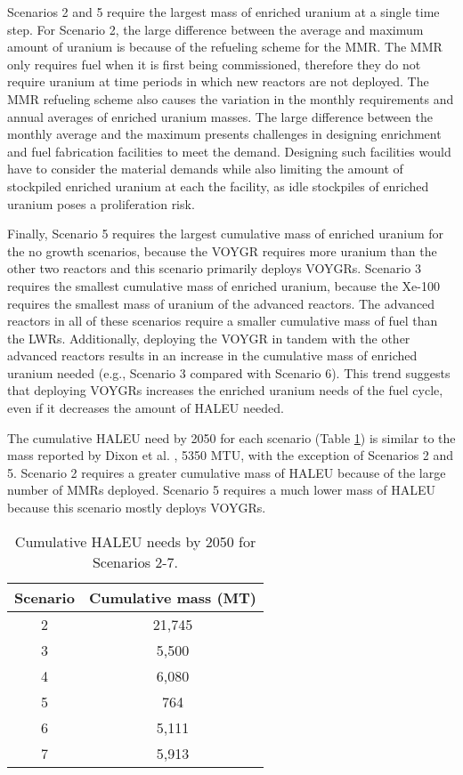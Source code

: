 Scenarios 2 and 5 require the largest mass of enriched uranium at a single 
time step. For Scenario 2, the large difference between the average and 
maximum amount of uranium is because of the refueling scheme for the 
\gls{MMR}. The \gls{MMR} only requires fuel when it is first being 
commissioned, therefore they do not require uranium at time periods in 
which
new reactors are not deployed. The \gls{MMR} refueling scheme also 
causes the variation in the monthly requirements and annual averages of 
enriched uranium masses. The large difference between the 
monthly average and the maximum presents challenges in designing enrichment 
and fuel fabrication facilities 
to meet the demand. Designing such facilities would have to consider the 
material demands while also limiting the amount of stockpiled enriched 
uranium at each the facility, as idle stockpiles of enriched uranium 
poses a proliferation risk. 

Finally, Scenario 5 requires the largest cumulative mass of enriched uranium 
for the no growth scenarios, because the VOYGR requires more uranium than 
the other two reactors and this scenario primarily deploys VOYGRs. Scenario 3 
requires the smallest cumulative 
mass of enriched uranium, because the Xe-100 requires the smallest mass of 
uranium of the advanced reactors. The advanced reactors 
in all of these scenarios require a smaller cumulative mass of fuel than 
the \glspl{LWR}. Additionally, deploying the VOYGR in tandem with the other 
advanced reactors results in an increase in the cumulative mass 
of enriched uranium needed (e.g., Scenario 3 compared with Scenario 6). This
trend suggests that deploying VOYGRs increases the enriched uranium needs 
of the fuel cycle, even if it decreases the amount of \gls{HALEU} needed. 

The cumulative \gls{HALEU} need by 2050 for each scenario (Table 
\ref{tab:nogrowth_haleu}) is similar to the mass reported by 
Dixon et al. \cite{dixon_estimated_2022}, 5350 MTU, with the exception 
of Scenarios 2 and 5. Scenario 2 requires a greater cumulative mass of 
\gls{HALEU} because of the large number of \glspl{MMR} deployed. Scenario 
5 requires a much lower mass of \gls{HALEU} because this scenario mostly 
deploys VOYGRs. 

\begin{table}
    \centering 
    \caption{Cumulative HALEU needs by 2050 for Scenarios 2-7.}
    \label{tab:nogrowth_haleu}
    \begin{tabular}{c c}
        \hline 
        Scenario & Cumulative mass (MT) \\
        \hline
        2 & 21,745\\
        3 & 5,500 \\
        4 & 6,080 \\
        5 & 764 \\
        6 & 5,111 \\
        7 & 5,913 \\
        \hline        
    \end{tabular}
\end{table}

